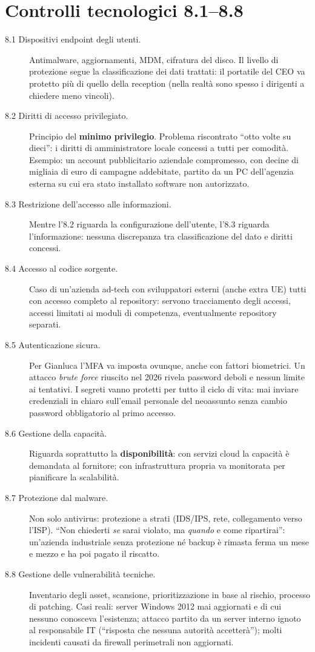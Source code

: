 \section{Controlli tecnologici 8.1--8.8}
\begin{description}
  \item[8.1 Dispositivi endpoint degli utenti.] Antimalware, aggiornamenti, MDM, cifratura del disco. Il
    livello di protezione segue la classificazione dei dati trattati: il portatile del CEO va protetto più
    di quello della reception (nella realtà sono spesso i dirigenti a chiedere meno vincoli).
  \item[8.2 Diritti di accesso privilegiato.] Principio del \textbf{minimo privilegio}. Problema
    riscontrato ``otto volte su dieci'': i diritti di amministratore locale concessi a tutti per comodità.
    Esempio: un account pubblicitario aziendale compromesso, con decine di migliaia di euro di campagne
    addebitate, partito da un PC dell'agenzia esterna su cui era stato installato software non autorizzato.
  \item[8.3 Restrizione dell'accesso alle informazioni.] Mentre l'8.2 riguarda la configurazione
    dell'utente, l'8.3 riguarda l'informazione: nessuna discrepanza tra classificazione del dato e diritti
    concessi.
  \item[8.4 Accesso al codice sorgente.] Caso di un'azienda ad-tech con sviluppatori esterni (anche extra
    UE) tutti con accesso completo al repository: servono tracciamento degli accessi, accessi limitati ai
    moduli di competenza, eventualmente repository separati.
  \item[8.5 Autenticazione sicura.] Per Gianluca l'MFA va imposta ovunque, anche con fattori biometrici.
    Un attacco \emph{brute force} riuscito nel 2026 rivela password deboli e nessun limite ai tentativi.
    I segreti vanno protetti per tutto il ciclo di vita: mai inviare credenziali in chiaro sull'email
    personale del neoassunto senza cambio password obbligatorio al primo accesso.
  \item[8.6 Gestione della capacità.] Riguarda soprattutto la \textbf{disponibilità}: con servizi cloud la
    capacità è demandata al fornitore; con infrastruttura propria va monitorata per pianificare la
    scalabilità.
  \item[8.7 Protezione dal malware.] Non solo antivirus: protezione a strati (IDS/IPS, rete, collegamento
    verso l'ISP). ``Non chiederti \emph{se} sarai violato, ma \emph{quando} e come ripartirai'': un'azienda
    industriale senza protezione né backup è rimasta ferma un mese e mezzo e ha poi pagato il riscatto.
  \item[8.8 Gestione delle vulnerabilità tecniche.] Inventario degli asset, scansione, prioritizzazione
    in base al rischio, processo di patching. Casi reali: server Windows 2012 mai aggiornati e di cui
    nessuno conosceva l'esistenza; attacco partito da un server interno ignoto al responsabile IT
    (``risposta che nessuna autorità accetterà''); molti incidenti causati da firewall perimetrali non
    aggiornati.
\end{description}

